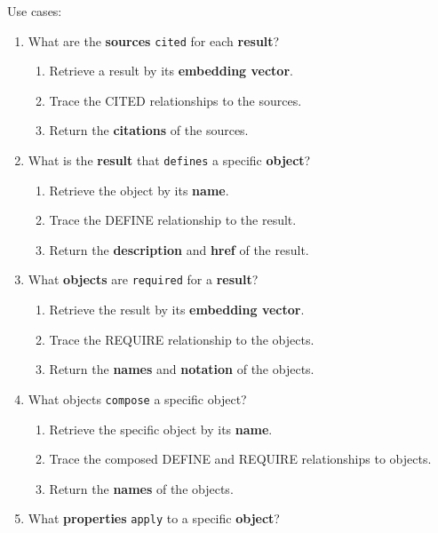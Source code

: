 \documentclass[
  british,
]{article}
\providecommand{\tightlist}{%
  \setlength{\itemsep}{0pt}\setlength{\parskip}{0pt}}
\begin{document}
Use cases:

\begin{enumerate}
\def\labelenumi{\arabic{enumi}.}
\tightlist
\item
  What are the \textbf{sources} \texttt{cited} for each \textbf{result}?

  \begin{enumerate}
  \def\labelenumii{\arabic{enumii}.}
  \tightlist
  \item
    Retrieve a result by its \textbf{embedding vector}.
  \item
    Trace the CITED relationships to the sources.
  \item
    Return the \textbf{citations} of the sources.
  \end{enumerate}
\item
  What is the \textbf{result} that \texttt{defines} a specific
  \textbf{object}?

  \begin{enumerate}
  \def\labelenumii{\arabic{enumii}.}
  \tightlist
  \item
    Retrieve the object by its \textbf{name}.
  \item
    Trace the DEFINE relationship to the result.
  \item
    Return the \textbf{description} and \textbf{href} of the result.
  \end{enumerate}
\item
  What \textbf{objects} are \texttt{required} for a \textbf{result}?

  \begin{enumerate}
  \def\labelenumii{\arabic{enumii}.}
  \tightlist
  \item
    Retrieve the result by its \textbf{embedding vector}.
  \item
    Trace the REQUIRE relationship to the objects.
  \item
    Return the \textbf{names} and \textbf{notation} of the objects.
  \end{enumerate}
\item
  What objects \texttt{compose} a specific object?

  \begin{enumerate}
  \def\labelenumii{\arabic{enumii}.}
  \tightlist
  \item
    Retrieve the specific object by its \textbf{name}.
  \item
    Trace the composed DEFINE and REQUIRE relationships to objects.
  \item
    Return the \textbf{names} of the objects.
  \end{enumerate}
\item
  What \textbf{properties} \texttt{apply} to a specific \textbf{object}?


\end{enumerate}
\end{document}
